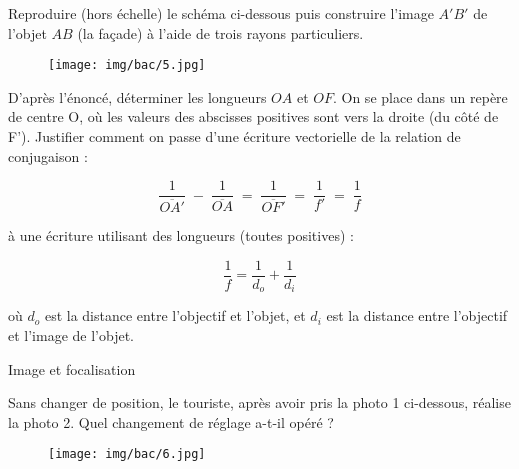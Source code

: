 \documentclass[answers]{exam}
\begin{document}
\begin{questions}

\question[1] Reproduire (hors échelle) le schéma ci-dessous puis construire l'image $A'B'$ de l'objet $AB$ (la façade) à l'aide de trois rayons particuliers.

\begin{figure}[H]
  \centering
  \texttt{[image: img/bac/5.jpg]}
\end{figure}

\question[1] D'après l'énoncé, déterminer les longueurs $OA$ et $OF$. On se place dans un repère de centre O, où les valeurs des abscisses positives sont vers la droite (du côté de F'). Justifier comment on passe d'une écriture vectorielle de la relation de conjugaison :

\[
  \frac{1}{\overline{OA'}} \;-\; \frac{1}{\overline{OA}}
  \;=\; \frac{1}{\overline{OF'}} 
  \;=\; \frac{1}{f'}
  \;=\; \frac{1}{f}
\]

à une écriture utilisant des longueurs (toutes positives) :

\[
  \frac{1}{f} = \frac{1}{d_o} + \frac{1}{d_i}
\]

où $d_o$ est la distance entre l'objectif et l'objet, et $d_i$ est la distance entre l'objectif et l'image de l'objet.

\question[4] Image et focalisation

\question[1] Sans changer de position, le touriste, après avoir pris la photo 1 ci-dessous, réalise la photo 2. Quel changement de réglage a-t-il opéré ?

\begin{figure}[H]
  \centering
  \texttt{[image: img/bac/6.jpg]}
\end{figure}

\end{questions}
\end{document}
